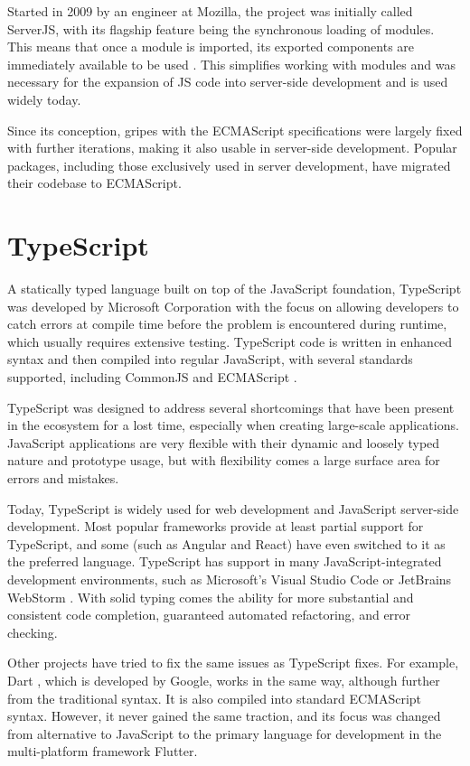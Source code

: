 Started in 2009 by an engineer at Mozilla, the project was initially called
ServerJS, with its flagship feature being the synchronous loading of modules.
This means that once a module is imported, its exported components are
immediately available to be used \cite{commonjs-introduction}. This simplifies
working with modules and was necessary for the expansion of JS code into
server-side development and is used widely today. 

Since its conception, gripes with the ECMAScript specifications were largely
fixed with further iterations, making it also usable in server-side development.
Popular packages, including those exclusively used in server development, have
migrated their codebase to ECMAScript.


\section*{TypeScript}
A statically typed language built on top of the JavaScript foundation,
TypeScript was developed by Microsoft Corporation with the focus on allowing
developers to catch errors at compile time before the problem is encountered
during runtime, which usually requires extensive testing. TypeScript code is
written in enhanced syntax and then compiled into regular JavaScript, with
several standards supported, including CommonJS and ECMAScript
\cite{typescript-modules}.

TypeScript was designed to address several shortcomings that have been present
in the ecosystem for a lost time, especially when creating large-scale
applications. JavaScript applications are very flexible with their dynamic and
loosely typed nature and prototype usage, but with flexibility comes a large
surface area for errors and mistakes. 

Today, TypeScript is widely used for web development and JavaScript server-side
development. Most popular frameworks provide at least partial support for
TypeScript, and some (such as Angular and React) have even switched to it as the
preferred language. TypeScript has support in many JavaScript-integrated
development environments, such as Microsoft's Visual Studio Code
\cite{typescript-vscode} or JetBrains WebStorm \cite{typescript-webstorm}. With
solid typing comes the ability for more substantial and consistent code
completion, guaranteed automated refactoring, and error checking.

Other projects have tried to fix the same issues as TypeScript fixes. For
example, Dart \cite{dart-homepage}, which is developed by Google, works in the
same way, although further from the traditional syntax. It is also compiled into
standard ECMAScript syntax. However, it never gained the same traction, and its
focus was changed from alternative to JavaScript to the primary language for
development in the multi-platform framework Flutter.


